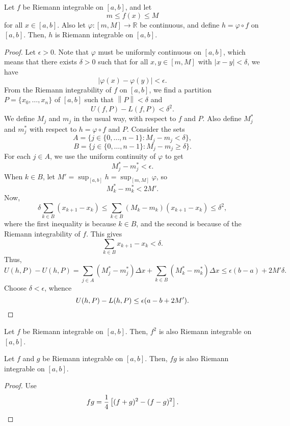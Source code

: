 \documentclass[11pt]{article}
\def\R{\mathbb{R}}
\newcommand\norm[1]{\left\lVert#1\right\rVert}
\theoremstyle{definition}
\theoremstyle{remark}
\numberwithin{equation}{module}
\begin{document}
    \begin{theorem}
        Let $f$ be Riemann integrable on $[a, b]$, and let \[
            m \leq f(x) \leq M
        \] for all $x \in [a, b]$. Also let $\varphi\colon [m, M] \to \R$ be
        continuous, and define $h = \varphi \circ f$ on $[a, b]$. Then, $h$ is
        Riemann integrable on $[a, b]$.
    \end{theorem}
    \begin{proof}
        Let $\epsilon > 0$. Note that $\varphi$ must be uniformly continuous on $[a,
        b]$, which means that there exists $\delta > 0$ such that for all $x, y \in
        [m, M]$ with $|x - y| < \delta$, we have \[
            |\varphi(x) - \varphi(y)| < \epsilon.
        \] From the Riemann integrability of $f$ on $[a, b]$, we find a partition
        $P = \{x_0, \dots, x_n\}$ of $[a, b]$ such that $\norm{P} < \delta$ and \[
            U(f, P) - L(f, P) < \delta^2.
        \] We define $M_j$ and $m_j$ in the usual way, with respect to $f$ and $P$.
        Also define $M_j^*$ and $m_j^*$ with respect to $h = \varphi\circ f$ and $P$.
        Consider the sets \[
            A = \{j \in \{0, \dots, n - 1\}\colon M_j - m_j < \delta\},
        \] \[
            B = \{j \in \{0, \dots, n - 1\}\colon M_j - m_j \geq \delta\}.
        \] For each $j \in A$, we use the uniform continuity of $\varphi$ to get \[
            M_j^* - m_j^* < \epsilon.
        \] When $k \in B$, let $M' = \sup_{[a, b]} h = \sup_{[m, M]} \varphi$, so \[
            M_k^* - m_k^* < 2M'.
        \] Now, \[
            \delta\sum_{k \in B} (x_{k + 1} - x_k) \leq \sum_{k \in B} (M_k -
            m_k)(x_{k + 1} - x_k) \leq \delta^2,
        \] where the first inequality is because $k \in B$, and the second is
        because of the Riemann integrability of $f$. This gives \[
            \sum_{k \in B} x_{k + 1} - x_k < \delta.
        \] Thus, \[
            U(h, P) - U(h, P) = \sum_{j \in A} (M_j^* - m_j^*)\Delta x + \sum_{k \in
            B} (M_k^* - m_k^*)\Delta x \leq \epsilon(b - a) + 2M'\delta.
        \] Choose $\delta < \epsilon$, whence \[
            U(h, P) - L(h, P) \leq \epsilon(a - b + 2M'). \qedhere
        \] 

    \end{proof}
    
    \begin{corollary}
        Let $f$ be Riemann integrable on $[a, b]$. Then, $f^2$ is also Riemann
        integrable on $[a, b]$.
    \end{corollary}

    \begin{corollary}
        Let $f$ and $g$ be Riemann integrable on $[a, b]$. Then, $fg$ is also
        Riemann integrable on $[a, b]$.
    \end{corollary}
    \begin{proof}
        Use \[
            fg = \frac{1}{4}\left[(f + g)^2 - (f - g)^2\right]. \qedhere
        \] 
    \end{proof}
\end{document}
